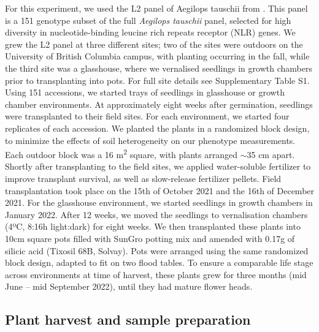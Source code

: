 \documentclass[12pt, letterpaper, ]{report}
\begin{document}
For this experiment, we used the L2 panel of Aegilops tauschii from \textcite{gaurav_population_2022}. This panel is a 151 genotype subset of the full \textit{Aegilops tauschii} panel, selected for high diversity in nucleotide-binding leucine rich repeats receptor (NLR) genes. We grew the L2 panel at three different sites; two of the sites were outdoors on the University of British Columbia campus, with planting occurring in the fall, while the third site was a glasshouse, where we vernalised seedlings in growth chambers prior to transplanting into pots. For full site details see Supplementary Table S1. Using 151 accessions, we started trays of seedlings in glasshouse or growth chamber environments. At approximately eight weeks after germination, seedlings were transplanted to their field sites. For each environment, we started four replicates of each accession. We planted the plants in a randomized block design, to minimize the effects of soil heterogeneity on our phenotype measurements. Each outdoor block was a 16 m\textsuperscript{2} square, with plants arranged $\sim$35 cm apart. Shortly after transplanting to the field sites, we applied water-soluble fertilizer to improve transplant survival, as well as slow-release fertilizer pellets. Field transplantation took place on the 15th of October 2021 and the 16th of December 2021. For the glasshouse environment, we started seedlings in growth chambers in January 2022. After 12 weeks, we moved the seedlings to vernalisation chambers (4ºC, 8:16h light:dark) for eight weeks. We then transplanted these plants into 10cm square pots filled with SunGro potting mix and amended with 0.17g of silicic acid (Tixosil 68B, Solvay). Pots were arranged using the same randomized block design, adapted to fit on two flood tables. To ensure a comparable life stage across environments at time of harvest, these plants grew for three months (mid June – mid September 2022), until they had mature flower heads. 

\subsection{Plant harvest and sample preparation}
\end{document}
